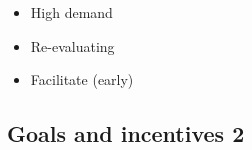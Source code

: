 \begin{frame}
    \begin{itemize}
      \item High demand %
      \item Re-evaluating %
      \item Facilitate (early) %
    \end{itemize}
      



\end{frame}


  \subsection{Goals and incentives 2}


